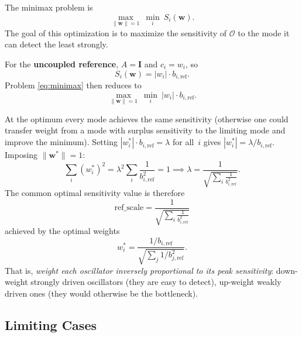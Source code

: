 \documentclass[11pt, letterpaper]{article}
\newcommand{\refsys}{\mathrm{ref}}
\newcommand{\bref}{b_{i,\refsys}}
\newcommand{\refscale}{\mathrm{ref\_scale}}
\begin{document}
The minimax problem is
\begin{equation}
  \label{eq:minimax}
  \max_{\|\mathbf{w}\|=1}\ \min_i\ S_i(\mathbf{w}).
\end{equation}
The goal of this optimization is to maximize the sensitivity of $\mathcal{O}$
to the mode it can detect the least strongly.

For the \textbf{uncoupled reference}, $A = \mathbf{I}$ and $c_i = w_i$, so
\begin{equation}
  S_i(\mathbf{w}) = |w_i| \cdot \bref.
\end{equation}
Problem \eqref{eq:minimax} then reduces to
\begin{equation}
  \max_{\|\mathbf{w}\|=1}\ \min_i\ |w_i| \cdot \bref.
\end{equation}

At the optimum every mode achieves the same sensitivity (otherwise one could
transfer weight from a mode with surplus sensitivity to the limiting mode and
improve the minimum).  Setting $|w_i^*| \cdot \bref = \lambda$ for all~$i$
gives $|w_i^*| = \lambda / \bref$.  Imposing $\|\mathbf{w}^*\|=1$:
\begin{equation}
  \sum_i (w_i^*)^2 = \lambda^2 \sum_i \frac{1}{\bref^2} = 1
  \implies
  \lambda = \frac{1}{\displaystyle\sqrt{\sum_i \frac{1}{\bref^2}}}.
\end{equation}
The common optimal sensitivity value is therefore
\begin{equation}
  \boxed{
    \refscale
    = \frac{1}{\displaystyle\sqrt{\sum_i \frac{1}{\bref^2}}}
  }
\end{equation}
achieved by the optimal weights
\begin{equation}
  w_i^* = \frac{1/\bref}{\displaystyle\sqrt{\sum_j 1/b_{j,\refsys}^2}}.
\end{equation}
That is, \emph{weight each oscillator inversely proportional to its peak
sensitivity}: down-weight strongly driven oscillators (they are easy to
detect), up-weight weakly driven ones (they would otherwise be the
bottleneck).

\subsection{Limiting Cases}
\end{document}
